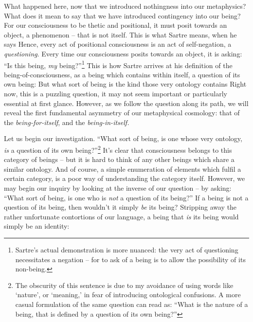 What happened here, now that we introduced nothingness into our metaphysics? What does it mean to say that we have introduced contingency into our being?  For our consciousness to be thetic and positional, it must posit towards an object, a phenomenon -- that is not itself. This is what Sartre means, when he says  Hence, every act of positional consciousness is an act of self-negation, a \emph{questioning}. Every time our consciousness posits towards an object, it is asking: \enquote{Is this being, \emph{my} being?}\footnote{Sartre's actual demonstration is more nuanced: the very act of questioning necessitates a negation -- for to ask of a being is to allow the possibility of its non-being.} This is how Sartre arrives at his definition of the being-of-consciousness, as a being which contains within itself, a question of its own being:  But what sort of being is the kind those very ontology contains  Right now, this is a puzzling question, it may not seem important or particularly essential at first glance. However, as we follow the question along its path, we will reveal the first fundamental asymmetry of our metaphysical cosmology: that of the \emph{being-for-itself}, and the \emph{being-in-itself.}

Let us begin our investigation. \enquote{What sort of being, is one whose very ontology, \emph{is} a question of its own being?}\footnote{The obscurity of this sentence is due to my avoidance of using words like \enquote*{nature}, or \enquote*{meaning,} in fear of introducing ontological confusions. A more casual formulation of the same question can read as: \enquote{What is the nature of a being, that is defined by a question of its own being?}} It's clear that consciousness belongs to this category of beings -- but it is hard to think of any other beings which share a similar ontology. And of course, a simple enumeration of elements which fulfil a certain category, is a poor way of understanding the category itself. However, we may begin our inquiry by looking at the inverse of our question -- by asking: \enquote{What sort of being, is one who is \emph{not} a question of its being?} If a being is not a question of its being, then wouldn't it simply \emph{be} its being? Stripping away the rather unfortunate contortions of our language, a being that \emph{is} its being would simply be an identity:

